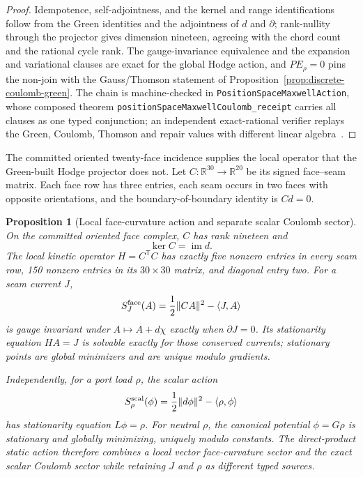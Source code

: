 \documentclass[11pt]{article}
\newtheorem{proposition}[theorem]{Proposition}
\theoremstyle{remark}
\theoremstyle{plain}
\begin{document}
\begin{proof}
Idempotence, self-adjointness, and the kernel and range identifications
follow from the Green identities and the adjointness of \(d\) and
\(\partial\); rank-nullity through the projector gives dimension nineteen,
agreeing with the chord count and the rational cycle rank. The
gauge-invariance equivalence and the expansion and variational clauses are
exact for the global Hodge action, and \(PE_\rho=0\) pins the non-join with
the Gauss/Thomson statement of
Proposition~\ref{prop:discrete-coulomb-green}. The chain is machine-checked
in \texttt{PositionSpaceMaxwellAction}, whose composed theorem
\texttt{positionSpaceMaxwellCoulomb\_\allowbreak receipt} carries all clauses
as one typed conjunction; an independent exact-rational verifier replays the
Green, Coulomb, Thomson and repair values with different linear
algebra~\cite{ophrepo}.
\end{proof}

The committed oriented twenty-face incidence supplies the local operator that
the Green-built Hodge projector does not. Let \(C:\mathbb R^{30}\to
\mathbb R^{20}\) be its signed face--seam matrix. Each face row has three
entries, each seam occurs in two faces with opposite orientations, and the
boundary-of-boundary identity is \(Cd=0\).

\begin{proposition}[Local face-curvature action and separate scalar Coulomb sector]
\label{prop:local-face-maxwell-action}
On the committed oriented face complex, \(C\) has rank nineteen and
\[
\ker C=\operatorname{im}d.
\]
The local kinetic operator \(H=C^{\mathsf T}C\) has exactly five nonzero
entries in every seam row, 150 nonzero entries in its \(30\times30\) matrix,
and diagonal entry two. For a seam current \(J\),
\[
S_J^{\rm face}(A)=\frac12\lVert CA\rVert^2-\langle J,A\rangle
\]
is gauge invariant under \(A\mapsto A+d\chi\) exactly when
\(\partial J=0\). Its stationarity equation \(HA=J\) is solvable exactly
for those conserved currents; stationary points are global minimizers and
are unique modulo gradients.

Independently, for a port load \(\rho\), the scalar action
\[
S_\rho^{\rm scal}(\phi)=\frac12\lVert d\phi\rVert^2-
\langle\rho,\phi\rangle
\]
has stationarity equation \(L\phi=\rho\). For neutral \(\rho\), the
canonical potential \(\phi=G\rho\) is stationary and globally minimizing,
uniquely modulo constants. The direct-product static action therefore
combines a local vector face-curvature sector and the exact scalar Coulomb
sector while retaining \(J\) and \(\rho\) as different typed sources.
\end{proposition}
\end{document}
